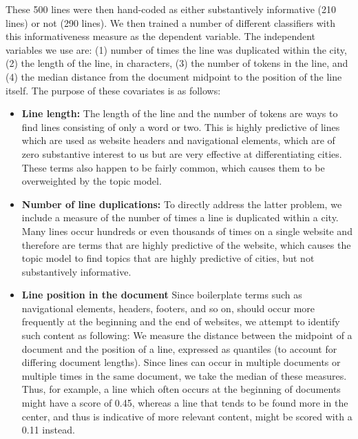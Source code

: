 \documentclass[11pt]{article}
\begin{document}
These 500 lines were then hand-coded as either substantively informative (210 lines) or not (290 lines). We then trained a number of different classifiers with this informativeness measure as the dependent variable. The independent variables we use are: (1) number of times the line was duplicated within the city, (2) the length of the line, in characters, (3) the number of tokens in the line, and (4) the median distance from the document midpoint to the position of the line itself. The purpose of these covariates is as follows:

\begin{itemize}
\item {\bf Line length:} The length of the line and the number of tokens are ways to find lines consisting of only a word or two. This is highly predictive of lines which are used as website headers and navigational elements, which are of zero substantive interest to us but are very effective at differentiating cities. These terms also happen to be fairly common, which causes them to be overweighted by the topic model.

\item {\bf Number of line duplications:} To directly address the latter problem, we include a measure of the number of times a line is duplicated within a city. Many lines occur hundreds or even thousands of times on a single website and therefore are terms that are highly predictive of the website, which causes the topic model to find topics that are highly predictive of cities, but not substantively informative.

\item {\bf Line position in the document} Since boilerplate terms such as navigational elements, headers, footers, and so on, should occur more frequently at the beginning and the end of websites, we attempt to identify such content as following: We measure the distance between the midpoint of a document and the position of a line, expressed as quantiles (to account for differing document lengths). Since lines can occur in multiple documents or multiple times in the same document, we take the median of these measures. Thus, for example, a line which often occurs at the beginning of documents might have a score of 0.45, whereas a line that tends to be found more in the center, and thus is indicative of more relevant content, might be scored with a 0.11 instead.
\end{itemize}


\end{document}
